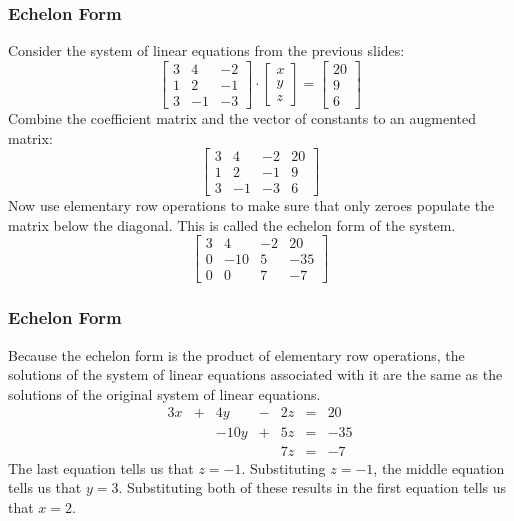 \documentclass[xcolor=dvipsnames]{beamer}
\begin{document}
\begin{frame}
  \frametitle{Echelon Form}
  Consider the system of linear equations from the previous slides:
  \begin{equation}
    \label{eq:angeezuh}
    \left[
      \begin{array}{ccc}
        3 & 4 & -2 \\
        1 & 2 & -1 \\
        3 & -1 & -3
      \end{array}\right]\cdot\left[
      \begin{array}{c}
        x \\
        y \\
        z
      \end{array}\right]=\left[
      \begin{array}{c}
        20 \\
        9 \\
        6
      \end{array}\right]
  \end{equation}
  Combine the coefficient matrix and the vector of constants to an
  \alert{augmented matrix}:
  \begin{equation}
    \label{eq:iezaayoo}
    \left[
      \begin{array}{cccc}
        3 & 4 & -2 & 20 \\
        1 & 2 & -1 & 9 \\
        3 & -1 & -3 & 6
      \end{array}\right]
  \end{equation}
Now use elementary row operations to make sure that only zeroes
populate the matrix below the diagonal. This is called the
\alert{echelon form} of the system.
\begin{equation}
  \label{eq:eitaewoo}
    \left[
      \begin{array}{cccc}
        3 & 4 & -2 & 20 \\
        0 & -10 & 5 & -35 \\
        0 & 0 & 7 & -7
      \end{array}\right]
\end{equation}
\end{frame}

\begin{frame}
  \frametitle{Echelon Form}
  Because the echelon form is the product of elementary row
  operations, the solutions of the system of linear equations
  associated with it are the same as the solutions of the original
  system of linear equations.
  \begin{equation}
    \label{eq:thiajaxe}
    \begin{array}{ccccccc}
      3x & + & 4y & - & 2z & = & 20 \\
       &  & -10y & + & 5z & = & -35 \\
      & & & & 7z & = & -7
    \end{array}
  \end{equation}
The last equation tells us that $z=-1$. Substituting $z=-1$, the
middle equation tells us that $y=3$. Substituting both of these
results in the first equation tells us that $x=2$.
\end{frame}
\end{document}

